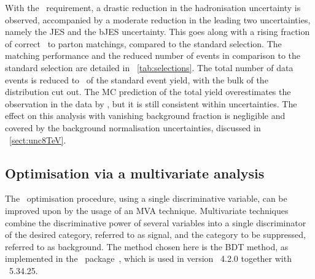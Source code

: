 %
With the \ptlb\ requirement, a drastic reduction in the hadronisation uncertainty is observed, accompanied by a moderate reduction in the leading two uncertainties, namely the \gls{JES} and the \gls{bJES} uncertainty. 
%
This goes along with a rising fraction of correct \bjet\ to parton matchings, compared to the standard selection. 
%
The matching performance and the reduced number of events in comparison to the standard selection are detailed in \tab~\ref{tab:selections}. The total number of data events is reduced to \OptiFraction\ of the standard event yield, with the bulk of the distribution cut out. The \gls{MC} prediction of the total yield overestimates the observation in the data by \DLevtexcopti, but it is still consistent within uncertainties. 
%
The effect on this analysis with vanishing background fraction is negligible and covered by the background normalisation uncertainties, discussed in \sect~\ref{sect:unc8TeV}.

























\subsection{Optimisation via a multivariate analysis}
\label{sect:evlselbdt}
%
The \cutbased\ optimisation procedure, using a single discriminative variable, can be improved upon by the usage of an \gls{MVA} technique. Multivariate techniques combine the discriminative power of several variables into a single discriminator of the desired category, referred to as signal, and the category to be suppressed, referred to as background. The method chosen here is the \gls{BDT} method, as implemented in the \TMVA\ package~\cite{Hocker:2007ht}, which is used in version \TMVA~4.2.0 together with \Root~5.34.25.



